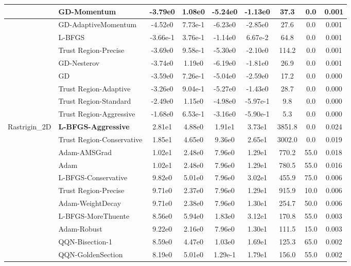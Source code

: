 \documentclass{article}
\begin{document}
\begin{longtable}{|l|l|c|c|c|c|c|c|c|}
\hline
 & GD-Momentum & -3.79e0 & 1.08e0 & -5.24e0 & -1.13e0 & 37.3 & 0.0 & 0.001 \\
\hline
 & GD-AdaptiveMomentum & -4.52e0 & 7.73e-1 & -6.23e0 & -2.85e0 & 27.6 & 0.0 & 0.001 \\
\hline
 & L-BFGS & -3.66e-1 & 3.76e-1 & -1.14e0 & 6.67e-2 & 64.8 & 0.0 & 0.001 \\
\hline
 & Trust Region-Precise & -3.69e0 & 9.58e-1 & -5.30e0 & -2.10e0 & 114.2 & 0.0 & 0.001 \\
\hline
 & GD-Nesterov & -3.74e0 & 1.19e0 & -6.19e0 & -1.81e0 & 26.9 & 0.0 & 0.001 \\
\hline
 & GD & -3.59e0 & 7.26e-1 & -5.04e0 & -2.59e0 & 17.2 & 0.0 & 0.000 \\
\hline
 & Trust Region-Adaptive & -3.26e0 & 9.04e-1 & -5.27e0 & -1.43e0 & 28.7 & 0.0 & 0.000 \\
\hline
 & Trust Region-Standard & -2.49e0 & 1.15e0 & -4.98e0 & -5.97e-1 & 9.8 & 0.0 & 0.000 \\
\hline
 & Trust Region-Aggressive & -1.68e0 & 6.53e-1 & -3.16e0 & -5.90e-1 & 5.3 & 0.0 & 0.000 \\
Rastrigin\_2D & \textbf{L-BFGS-Aggressive} & 2.81e1 & 4.88e0 & 1.91e1 & 3.73e1 & 3851.8 & 0.0 & 0.024 \\
\hline
 & Trust Region-Conservative & 1.85e1 & 4.65e0 & 9.36e0 & 2.65e1 & 3002.0 & 0.0 & 0.019 \\
\hline
 & Adam-AMSGrad & 1.02e1 & 2.48e0 & 7.96e0 & 1.29e1 & 770.2 & 55.0 & 0.018 \\
\hline
 & Adam & 1.02e1 & 2.48e0 & 7.96e0 & 1.29e1 & 780.5 & 55.0 & 0.016 \\
\hline
 & L-BFGS-Conservative & 9.82e0 & 5.01e0 & 7.96e0 & 3.02e1 & 455.9 & 75.0 & 0.006 \\
\hline
 & Trust Region-Precise & 9.71e0 & 2.37e0 & 7.96e0 & 1.29e1 & 915.9 & 10.0 & 0.006 \\
\hline
 & Adam-WeightDecay & 9.71e0 & 2.38e0 & 7.96e0 & 1.30e1 & 254.7 & 50.0 & 0.006 \\
\hline
 & L-BFGS-MoreThuente & 8.56e0 & 5.94e0 & 1.83e0 & 3.12e1 & 170.8 & 55.0 & 0.003 \\
\hline
 & Adam-Robust & 9.22e0 & 2.16e0 & 7.96e0 & 1.30e1 & 111.5 & 15.0 & 0.003 \\
\hline
 & QQN-Bisection-1 & 8.59e0 & 4.47e0 & 1.03e0 & 1.69e1 & 125.3 & 65.0 & 0.002 \\
\hline
 & QQN-GoldenSection & 8.19e0 & 5.01e0 & 1.29e-1 & 1.79e1 & 156.0 & 55.0 & 0.002 \\

\end{longtable}
\end{document}
